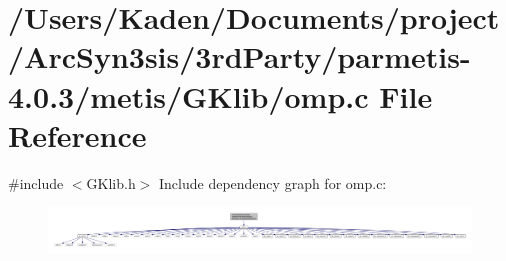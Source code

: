\hypertarget{a00122}{}\section{/\+Users/\+Kaden/\+Documents/project/\+Arc\+Syn3sis/3rd\+Party/parmetis-\/4.0.3/metis/\+G\+Klib/omp.c File Reference}
\label{a00122}
{\ttfamily \#include $<$G\+Klib.\+h$>$}\newline
Include dependency graph for omp.\+c\+:\nopagebreak
\begin{figure}[H]
\begin{center}
\leavevmode
\includegraphics[width=350pt]{a00123}
\end{center}
\end{figure}
